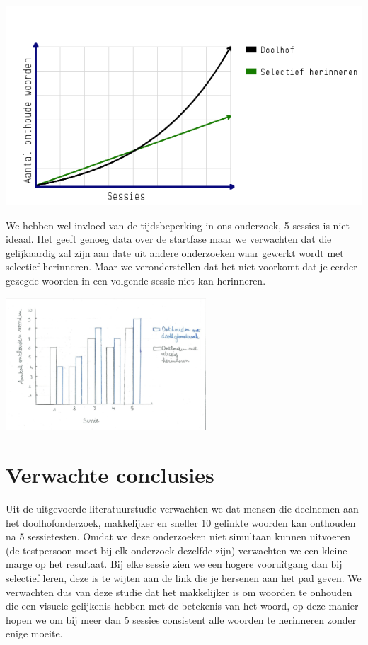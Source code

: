 \documentclass{voorstel}
\begin{document}
	
		\includegraphics[width=\linewidth]{img/chart1.png}

	
	
	
	We hebben wel invloed van de tijdsbeperking in ons onderzoek, 5 sessies is niet ideaal. Het geeft genoeg data over de startfase maar we verwachten dat die gelijkaardig zal zijn aan date uit andere onderzoeken
	waar gewerkt wordt met selectief herinneren. Maar we veronderstellen dat het niet voorkomt dat je eerder gezegde woorden in een volgende sessie niet kan herinneren.
	
	\includegraphics[width=7.5cm]{img/chart2.png}
	
	\section{Verwachte conclusies}
	\label{sec:verwachte_conclusies}
	
	Uit de uitgevoerde literatuurstudie verwachten we dat mensen die deelnemen aan het doolhofonderzoek, makkelijker en sneller 10 gelinkte woorden kan onthouden na 5 sessietesten. Omdat we deze onderzoeken niet
	simultaan kunnen uitvoeren (de testpersoon moet bij elk onderzoek dezelfde zijn) verwachten we een kleine marge op het resultaat. Bij elke sessie zien we een hogere vooruitgang dan bij selectief leren, deze
	is te wijten aan de link die je hersenen aan het pad geven. We verwachten dus van deze studie dat het makkelijker is om woorden te onhouden die een visuele gelijkenis hebben met de betekenis van het woord, op
	deze manier hopen we om bij meer dan 5 sessies consistent alle woorden te herinneren zonder enige moeite.
	
\end{document}
